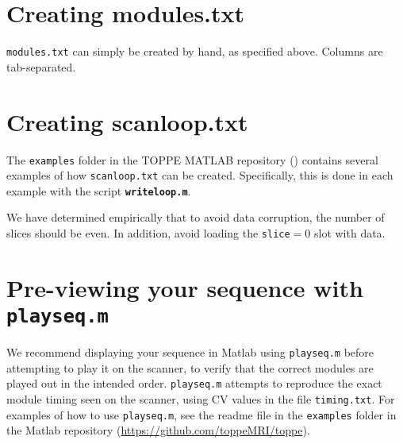 \section{Creating modules.txt}
{\tt modules.txt} can simply be created by hand, as specified above.
Columns are tab-separated.


\section{Creating scanloop.txt}
The {\tt examples} folder in the TOPPE MATLAB repository (\matrep) contains several examples of how {\tt scanloop.txt} can be created.
Specifically, this is done in each example with the script {\tt \bf writeloop.m}.

We have determined empirically that to avoid data corruption, the number of slices should be even.
In addition, avoid loading the {\tt slice}$=0$ slot with data. 


\section{Pre-viewing your sequence with {\tt playseq.m} }

We recommend displaying your sequence in Matlab using \texttt{playseq.m} before attempting to play it on the scanner, to verify that the correct modules are played out in the intended order.
\texttt{playseq.m} attempts to reproduce the exact module timing seen on the scanner, using CV values in the file \texttt{timing.txt}.
For examples of how to use \texttt{playseq.m}, see the readme file in the {\tt examples} folder in the Matlab repository (\url{https://github.com/toppeMRI/toppe}).





